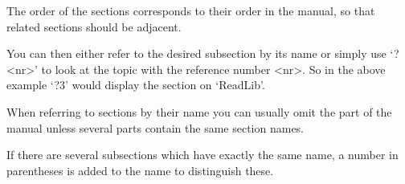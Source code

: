 The order of the sections corresponds to their order in the
{\GAP} manual, so that related sections should be adjacent.

You can then either refer to the desired subsection by its name or simply
use `?<nr>' to look at the topic with the reference number <nr>. So in the
above example `?3' would display the section on `ReadLib'.

When referring to sections by their name you can usually omit the part
of the manual unless several parts contain the same section names.

If there are several subsections which have exactly the same name, a number
in parentheses is added to the name to distinguish these.


